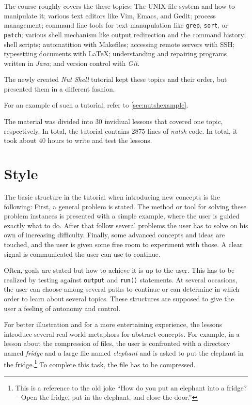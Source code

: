 \documentclass[paper=a4,twoside,abstract=on,cleardoublepage=empty,numbers=noenddot,toc=bib,12pt]{scrreprt}
\begin{document}
The course roughly covers the these topics: The \textsc{UNIX} file system and how to manipulate it; various text editors like Vim, Emacs, and Gedit; process management; command line tools for text manupulation like \texttt{grep}, \texttt{sort}, or \texttt{patch}; various shell mechanism like output redirection and the command history; shell scripts; automatition with Makefiles; accessing remote servers with \textsc{SSH}; typesetting documents with \LaTeX; understanding and repairing programs written in \textit{Java}; and version control with \textit{Git}.

The newly created \textit{Nut Shell} tutorial kept these topics and their order, but presented them in a different fashion.

For an example of such a tutorial, refer to \cref{sec:nutshexample}.

The material was divided into 30 invidiual lessons that covered one topic, respectively. In total, the tutorial contains 2875 lines of \textit{nutsh} code. In total, it took about 40 hours to write and test the lessons.

\section{Style}

The basic structure in the tutorial when introducing new concepts is the following: First, a general problem is stated. The method or tool for solving these problem instances is presented with a simple example, where the user is guided exactly what to do. After that follow several problems the user has to solve on his own of increasing difficulty. Finally, some advanced concepts and ideas are touched, and the user is given some free room to experiment with those. A clear signal is communicated the user can use to continue.

Often, goals are stated but how to achieve it is up to the user. This has to be realized by testing against \texttt{output} and \texttt{run()} statements. At several occasions, the user can choose among several paths to continue or can determine in which order to learn about several topics. These structures are supposed to give the user a feeling of autonomy and control.

For better illustration and for a more entertaining experience, the lessons introduce several real-world metaphors for abstract concepts. For example, in a lesson about the compression of files, the user is confronted with a directory named \textit{fridge} and a large file named \textit{elephant} and is asked to put the elephant in the fridge.\footnote{This is a reference to the old joke “How do you put an elephant into a fridge? -- Open the fridge, put in the elephant, and close the door.”} To complete this task, the file has to be compressed.
\end{document}

